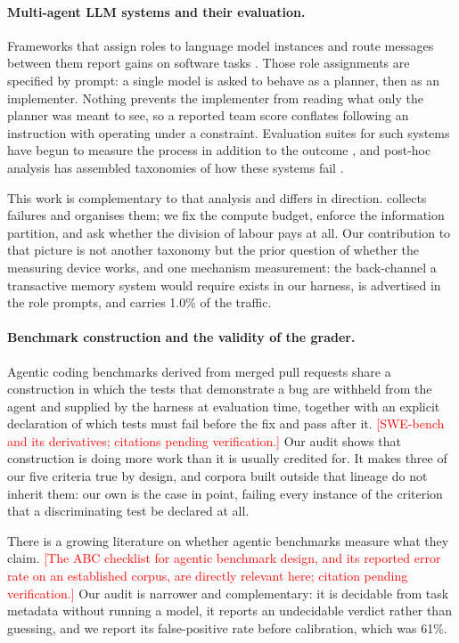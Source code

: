 \documentclass[11pt]{article}
\newcommand{\todo}[1]{\textcolor{red}{[#1]}}
\begin{document}
\paragraph{Multi-agent LLM systems and their evaluation.} Frameworks that assign
roles to language model instances and route messages between them report gains
on software tasks \citep{chatdev2024,autogen2023}. Those role assignments are
specified by prompt: a single model is asked to behave as a planner, then as an
implementer. Nothing prevents the implementer from reading what only the planner
was meant to see, so a reported team score conflates following an instruction
with operating under a constraint. Evaluation suites for such systems have begun
to measure the process in addition to the outcome
\citep{multiagentbench2025}, and post-hoc analysis has assembled taxonomies of
how these systems fail \citep{cemri2025why}.

This work is complementary to that analysis and differs in direction.
\citet{cemri2025why} collects failures and organises them; we fix the compute
budget, enforce the information partition, and ask whether the division of
labour pays at all. Our contribution to that picture is not another taxonomy but
the prior question of whether the measuring device works, and one mechanism
measurement: the back-channel a transactive memory system would require exists
in our harness, is advertised in the role prompts, and carries 1.0\% of the
traffic.

\paragraph{Benchmark construction and the validity of the grader.} Agentic
coding benchmarks derived from merged pull requests share a construction in
which the tests that demonstrate a bug are withheld from the agent and supplied
by the harness at evaluation time, together with an explicit declaration of
which tests must fail before the fix and pass after it. \todo{SWE-bench and its
derivatives; citations pending verification.} Our audit shows that construction
is doing more work than it is usually credited for. It makes three of our five
criteria true by design, and corpora built outside that lineage do not inherit
them: our own is the case in point, failing every instance of the criterion that
a discriminating test be declared at all.

There is a growing literature on whether agentic benchmarks measure what they
claim. \todo{The ABC checklist for agentic benchmark design, and its reported
error rate on an established corpus, are directly relevant here; citation
pending verification.} Our audit is narrower and complementary: it is decidable
from task metadata without running a model, it reports an undecidable verdict
rather than guessing, and we report its false-positive rate before calibration,
which was 61\%.
\end{document}
